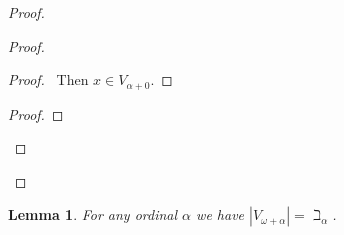 \documentclass{report}
\let\qed\relax
\newtheorem{lemma}[axiom]{Lemma}
\theoremstyle{definition}
\begin{document}
    \begin{proof}
        \pf
        \begin{proof}
            \begin{proof}
                \pf\ Then $x \in V_{\alpha + 0}$.
            \end{proof}
            \begin{proof}
            \end{proof}
        \end{proof}
        \qed
    \end{proof}

    \begin{lemma}
        For any ordinal $\alpha$ we have $|V_{\omega + \alpha}| = \beth_\alpha$.
    \end{lemma}
\end{document}
